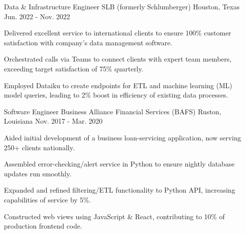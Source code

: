\begin{cventries}
  \cventry
    {Data \& Infrastructure Engineer} %
    {SLB (formerly Schlumberger)} %
    {Houston, Texas} %
    {Jun. 2022 - Nov. 2022} %
    {
      \begin{cvitems} %
        \item {Delivered excellent service to international clients to ensure 100\% customer satisfaction with company’s data management software.}
        \item {Orchestrated calls via Teams to connect clients with expert team members, exceeding target satisfaction of 75\% quarterly.}
        \item {Employed Dataiku to create endpoints for ETL and machine learning (ML) model queries, leading to 2\% boost in efficiency of existing data processes.}
      \end{cvitems}
    }

  \cventry
    {Software Engineer} %
    {Business Alliance Financial Services (BAFS)} %
    {Ruston, Louisiana} %
    {Nov. 2017 - Mar. 2020} %
    {
      \begin{cvitems}
        \item {Aided initial development of a business loan-servicing application, now serving 250+ clients nationally.}
        \item {Assembled error-checking/alert service in Python to ensure nightly database updates run smoothly.}
        \item {Expanded and refined filtering/ETL functionality to Python API, increasing capabilities of service by 5\%.}
        \item {Constructed web views using JavaScript \& React, contributing to 10\% of production frontend code.}
      \end{cvitems}
    }


\end{cventries}
